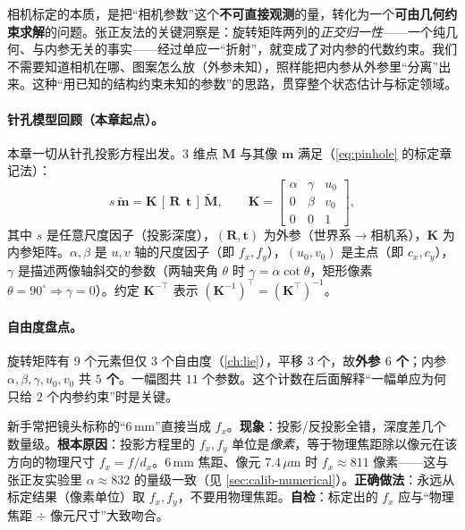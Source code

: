 \begin{insight}
相机标定的本质，是把“相机参数”这个\textbf{不可直接观测}的量，转化为一个\textbf{可由几何约束求解}的问题。张正友法的关键洞察是：旋转矩阵两列的\emph{正交归一性}——一个纯几何、与内参无关的事实——经过单应一“折射”，就变成了对内参的代数约束。我们不需要知道相机在哪、图案怎么放（外参未知），照样能把内参从外参里“分离”出来。这种“用已知的结构约束未知的参数”的思路，贯穿整个状态估计与标定领域。
\end{insight}

\paragraph{针孔模型回顾（本章起点）。}
本章一切从针孔投影方程出发。$3$ 维点 $\mathbf{M}$ 与其像 $\mathbf{m}$ 满足（\cref{eq:pinhole} 的标定章记法\cite{zhang2000calibration}）：
\begin{equation}
  s\,\tilde{\mathbf{m}} = \mathbf{K}\,[\,\mathbf{R}\ \ \mathbf{t}\,]\,\tilde{\mathbf{M}},
  \qquad
  \mathbf{K}=\begin{bmatrix} \alpha & \gamma & u_0\\ 0 & \beta & v_0\\ 0 & 0 & 1\end{bmatrix},
  \label{eq:calib-pinhole}
\end{equation}
其中 $s$ 是任意尺度因子（投影深度），$(\mathbf{R},\mathbf{t})$ 为外参（世界系$\to$相机系），$\mathbf{K}$ 为内参矩阵。$\alpha,\beta$ 是 $u,v$ 轴的尺度因子（即 $f_x,f_y$），$(u_0,v_0)$ 是主点（即 $c_x,c_y$），$\gamma$ 是描述两像轴斜交的参数（两轴夹角 $\theta$ 时 $\gamma=\alpha\cot\theta$，矩形像素 $\theta=90^\circ\Rightarrow\gamma=0$）。约定 $\mathbf{K}^{-\top}$ 表示 $(\mathbf{K}^{-1})^\top=(\mathbf{K}^\top)^{-1}$。

\paragraph{自由度盘点。}
旋转矩阵有 $9$ 个元素但仅 $3$ 个自由度（\cref{ch:lie}），平移 $3$ 个，故\textbf{外参 $6$ 个}；内参 $\alpha,\beta,\gamma,u_0,v_0$ 共 \textbf{$5$ 个}。一幅图共 $11$ 个参数。这个计数在后面解释“一幅单应为何只给 $2$ 个内参约束”时是关键。

\begin{pitfall}
新手常把镜头标称的“$6\,\mathrm{mm}$”直接当成 $f_x$。\textbf{现象}：投影/反投影全错，深度差几个数量级。\textbf{根本原因}：投影方程里的 $f_x,f_y$ 单位是\emph{像素}，等于物理焦距除以像元在该方向的物理尺寸 $f_x=f/d_x$。$6\,\mathrm{mm}$ 焦距、像元 $7.4\,\mu\mathrm{m}$ 时 $f_x\approx811$ 像素——这与张正友实验里 $\alpha\approx832$ 的量级一致（见 \cref{sec:calib-numerical}）。\textbf{正确做法}：永远从标定结果（像素单位）取 $f_x,f_y$，不要用物理焦距。\textbf{自检}：标定出的 $f_x$ 应与“物理焦距 $\div$ 像元尺寸”大致吻合。
\end{pitfall}

